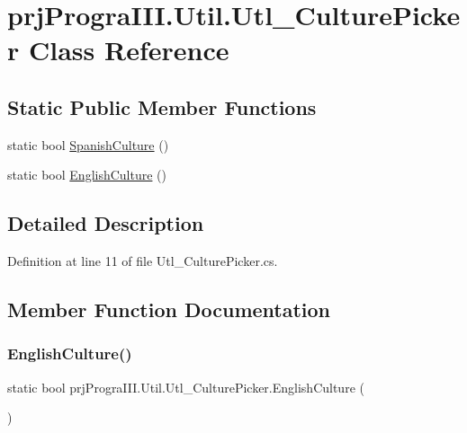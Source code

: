 \hypertarget{classprj_progra_i_i_i_1_1_util_1_1_utl___culture_picker}{}\section{prj\+Progra\+I\+I\+I.\+Util.\+Utl\+\_\+\+Culture\+Picker Class Reference}
\label{classprj_progra_i_i_i_1_1_util_1_1_utl___culture_picker}
\subsection*{Static Public Member Functions}
\begin{DoxyCompactItemize}
\item 
static bool \hyperlink{classprj_progra_i_i_i_1_1_util_1_1_utl___culture_picker_a4db175f0a2e18afa3bb5212eeba01f26}{Spanish\+Culture} ()
\item 
static bool \hyperlink{classprj_progra_i_i_i_1_1_util_1_1_utl___culture_picker_a08e6cd1e97bc6f89dbce163b9de751c1}{English\+Culture} ()
\end{DoxyCompactItemize}


\subsection{Detailed Description}


Definition at line 11 of file Utl\+\_\+\+Culture\+Picker.\+cs.



\subsection{Member Function Documentation}
\hypertarget{classprj_progra_i_i_i_1_1_util_1_1_utl___culture_picker_a08e6cd1e97bc6f89dbce163b9de751c1}{}\label{classprj_progra_i_i_i_1_1_util_1_1_utl___culture_picker_a08e6cd1e97bc6f89dbce163b9de751c1} 
\subsubsection{\texorpdfstring{English\+Culture()}{EnglishCulture()}}
{\footnotesize\ttfamily static bool prj\+Progra\+I\+I\+I.\+Util.\+Utl\+\_\+\+Culture\+Picker.\+English\+Culture (\begin{DoxyParamCaption}{ }\end{DoxyParamCaption})\hspace{0.3cm}{\ttfamily [static]}}



